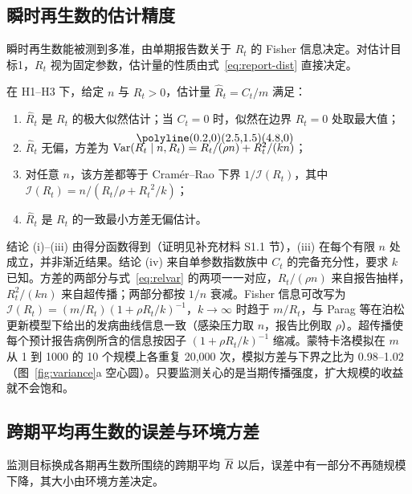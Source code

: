 \subsection{瞬时再生数的估计精度}
\label{sec:res-current}

瞬时再生数能被测到多准，由单期报告数关于 $R_t$ 的 Fisher 信息决定。对估计目标1，$R_t$ 视为固定参数，估计量的性质由式~\eqref{eq:report-dist} 直接决定。

\begin{proposition}[瞬时再生数的有效估计]
\label{prop:current}
在 H1--H3 下，给定 $n$ 与 $R_t>0$，估计量 $\widehat R_t=C_t/m$ 满足：
\begin{enumerate}[label=(\roman*)]
  \item $\widehat R_t$ 是 $R_t$ 的极大似然估计；当 $C_t=0$ 时，似然在边界 $R_t=0$ 处取最大值；
  \item $\widehat R_t$ 无偏，方差为 $\Var(\widehat R_t\mid n,R_t)=R_t/(\rho n)+R_t^2/(kn)$；
  \item 对任意 $n$，该方差都等于 Cramér--Rao 下界 $1/\mathcal I(R_t)$，其中 $\mathcal I(R_t)=n/(R_t/\rho+{R_t}^2/k)$；
  \item $\widehat R_t$ 是 $R_t$ 的一致最小方差无偏估计。
\end{enumerate}
\end{proposition}

结论 (i)--(iii) 由得分函数得到（证明见补充材料 S1.1 节），(iii) 在每个有限 $n$ 处成立，并非渐近结果。结论 (iv) 来自单参数指数族中 $C_t$ 的完备充分性，要求 $k$ 已知\citep{lehmann1998point, casella2002statistical}。方差的两部分与式~\eqref{eq:relvar} 的两项一一对应，$R_t/(\rho n)$ 来自报告抽样，$R_t^2/(kn)$ 来自超传播；两部分都按 $1/n$ 衰减。Fisher 信息可改写为 $\mathcal I(R_t)=(m/R_t)(1+\rho R_t/k)^{-1}$，$k\to\infty$ 时趋于 $m/R_t$，与 Parag 等\citep{parag2022quantifying}在泊松更新模型下给出的发病曲线信息一致（感染压力取 $n$，报告比例取 $\rho$）。超传播使每个预计报告病例所含的信息按因子 $(1+\rho R_t/k)^{-1}$ 缩减。蒙特卡洛模拟在 $m$ 从 1 到 1000 的 10 个规模上各重复 20,000 次，模拟方差与下界之比为 0.98--1.02（图~\ref{fig:variance}a 空心圆）。只要监测关心的是当期传播强度，扩大规模的收益就不会饱和。

\subsection{跨期平均再生数的误差与环境方差}
\label{sec:res-average}

监测目标换成各期再生数所围绕的跨期平均 $\overline{R}$ 以后，误差中有一部分不再随规模下降，其大小由环境方差决定。

